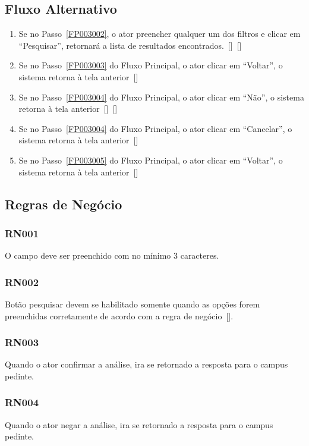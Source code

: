 \begin{anexosenv}
\subsection*{Fluxo Alternativo}
\begin{enumerate}
    \item Se no Passo~\ref{FP003002}, o ator preencher qualquer um dos filtros e clicar em ``Pesquisar'', retornará a lista de resultados encontrados.~[]~[]
    \item Se no Passo~\ref{FP003003} do Fluxo Principal, o ator clicar em ``Voltar'', o sistema retorna à tela anterior~[]
    \item Se no Passo~\ref{FP003004} do Fluxo Principal, o ator clicar em ``Não'', o sistema retorna à tela anterior~[]~[]
    \item Se no Passo~\ref{FP003004} do Fluxo Principal, o ator clicar em ``Cancelar'', o sistema retorna à tela anterior~[]
    \item Se no Passo~\ref{FP003005} do Fluxo Principal, o ator clicar em ``Voltar'', o sistema retorna à tela anterior~[]
\end{enumerate}

\subsection*{Regras de Negócio}

\subsubsection*{RN001}\label{rn005}
O campo deve ser preenchido com no mínimo 3 caracteres.
\subsubsection*{RN002}\label{rn006}
Botão pesquisar devem se habilitado somente quando as opções forem preenchidas corretamente de acordo com a regra de negócio~[]. 
\subsubsection*{RN003}\label{rn007}
Quando o ator confirmar a análise, ira se retornado a resposta para o campus pedinte.
\subsubsection*{RN004}\label{rn008}
Quando o ator negar a análise, ira se retornado a resposta para o campus pedinte.

\end{anexosenv}
